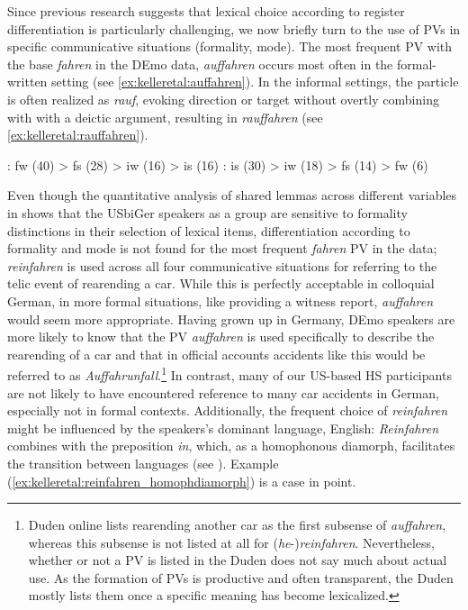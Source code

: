 \documentclass[output=paper,colorlinks,citecolor=brown]{langscibook}
\begin{document}
Since previous research suggests that lexical choice according to register differentiation is particularly challenging, we now briefly turn to the use of PVs in specific communicative situations (formality, mode). The most frequent PV with the base \textit{fahren} in the DEmo data, \textit{auffahren} occurs most often in the formal-written setting (see \ref{ex:kelleretal:auffahren}). In the informal settings, the particle is often realized as \textit{rauf}, evoking direction or target without overtly combining with with a deictic argument, resulting in \textit{rauffahren} (see \ref{ex:kelleretal:rauffahren}). 

\begin{exe}
    : fw (40) \textgreater{} fs (28) \textgreater{} iw (16) \textgreater{} is (16) \label{ex:kelleretal:auffahren}
    : is (30) \textgreater{} iw (18) \textgreater{} fs (14) \textgreater{} fw (6) \label{ex:kelleretal:rauffahren}
\end{exe}

Even though the quantitative analysis of shared lemmas across different variables in  shows that the USbiGer speakers as a group are sensitive to formality distinctions in their selection of lexical items, differentiation according to formality and mode is not found for the most frequent \textit{fahren} PV in the data; \textit{reinfahren} is used across all four communicative situations for referring to the telic event of rearending a car. While this is perfectly acceptable in colloquial German, in more formal situations, like providing a witness report, \textit{auffahren} would seem more appropriate. Having grown up in Germany, DEmo speakers are more likely to know that the PV \textit{auffahren} is used specifically to describe the rearending of a car and that in official accounts accidents like this would be referred to as \textit{Auffahrunfall}.\footnote{Duden online lists rearending another car as the first subsense of \textit{auffahren}, whereas this subsense is not listed at all for (\textit{he}-)\textit{reinfahren}. Nevertheless, whether or not a PV is listed in the Duden does not say much about actual use. As the formation of PVs is productive and often transparent, the Duden mostly lists them once a specific meaning has become lexicalized.}  In contrast, many of our US-based HS participants are not likely to have encountered reference to many car accidents in German, especially not in formal contexts. Additionally, the frequent choice of \textit{reinfahren} might be influenced by the speakers’s dominant language, English: \textit{Reinfahren} combines with the preposition \textit{in}, which, as a homophonous diamorph, facilitates the transition between languages (see \cites{Clyne1967Transference}[133]{Muysken2000Bilingual}). Example (\ref{ex:kelleretal:reinfahren_homophdiamorph}) is a case in point.
\end{document}
